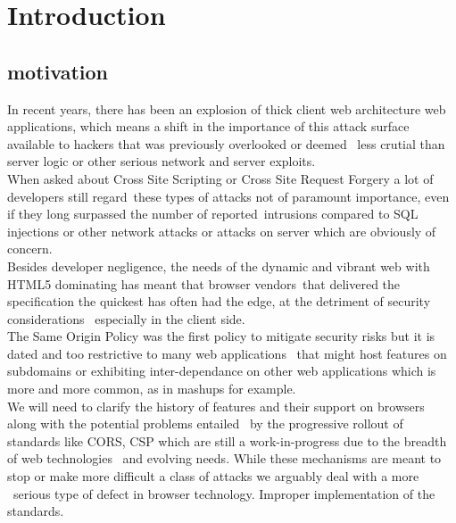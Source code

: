 \documentclass[a4paper,12pt]{report}
\begin{document}
\tableofcontents
\listoffigures
\listoftables

\pagebreak
{}

\section{Introduction}

\subsection{motivation}
In recent years, there has been an explosion of thick client web architecture web applications,
which means a shift in the importance of this attack surface available to hackers that was previously overlooked or deemed \
less crutial than server logic or other serious network and server exploits.\\

When asked about Cross Site Scripting or Cross Site Request Forgery a lot of developers still regard\
these types of attacks not of paramount importance, even if they long surpassed the number of reported\
intrusions compared to SQL injections or other network attacks or attacks on server which are obviously of concern.\\

Besides developer negligence, the needs of the dynamic and vibrant web with HTML5 dominating has meant that browser vendors\
that delivered the specification the quickest has often had the edge, at the detriment of security considerations \
especially in the client side.\\

The Same Origin Policy was the first policy to mitigate security risks but it is dated and too restrictive to many web applications \
that might host features on subdomains or exhibiting inter-dependance on other web applications which is more and more common, as in mashups \cite{mashup} for example.\\

We will need to clarify the history of features and their support on browsers along with the potential problems entailed \
by the progressive rollout of standards like CORS, CSP which are still a work-in-progress due to the breadth of web technologies \
and evolving needs. While these mechanisms are meant to stop or make more difficult a class of attacks we arguably deal with a more \
serious type of defect in browser technology. Improper implementation of the standards.\\
\end{document}
